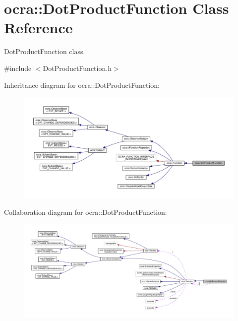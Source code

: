 \hypertarget{classocra_1_1DotProductFunction}{}\section{ocra\+:\+:Dot\+Product\+Function Class Reference}
\label{classocra_1_1DotProductFunction}


Dot\+Product\+Function class.  




{\ttfamily \#include $<$Dot\+Product\+Function.\+h$>$}



Inheritance diagram for ocra\+:\+:Dot\+Product\+Function\+:\nopagebreak
\begin{figure}[H]
\begin{center}
\leavevmode
\includegraphics[width=350pt]{d7/db6/classocra_1_1DotProductFunction__inherit__graph}
\end{center}
\end{figure}


Collaboration diagram for ocra\+:\+:Dot\+Product\+Function\+:\nopagebreak
\begin{figure}[H]
\begin{center}
\leavevmode
\includegraphics[width=350pt]{d1/dab/classocra_1_1DotProductFunction__coll__graph}
\end{center}
\end{figure}
